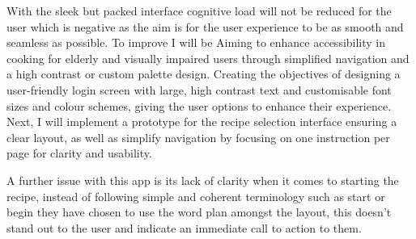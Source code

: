\documentclass[]{project_final}
\begin{document}
With the sleek but packed interface cognitive load will not be reduced for the user which is negative as the aim is for the user experience to be as smooth and seamless as possible.
To improve I will be Aiming to enhance accessibility in cooking for elderly and visually impaired users through simplified navigation and a high contrast or custom palette design. Creating the objectives of designing a user-friendly login screen with large, high contrast text and customisable font sizes and colour schemes, giving the user options to enhance their experience. Next, I will implement a prototype for the recipe selection interface ensuring a clear layout, as well as simplify navigation by focusing on one instruction per page for clarity and usability.

A further issue with this app is its lack of clarity when it comes to starting the recipe, instead of following simple and coherent terminology such as start or begin they have chosen to use the word plan amongst the layout, this doesn’t stand out to the user and indicate an immediate call to action to them.
\end{document}
